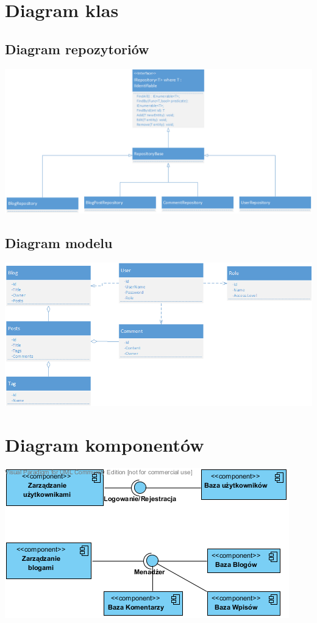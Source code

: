 \documentclass{article}
\begin{document}
\section{Diagram klas}
\subsection{Diagram repozytoriów}
\includegraphics[width=\textwidth]{RepositoryClassDiagram}
\subsection{Diagram modelu}
\includegraphics[width=\textwidth]{ModelClassDiagram}
\section{Diagram komponentów}
\includegraphics[width=\textwidth]{ComponetDiagram}
\end{document}
